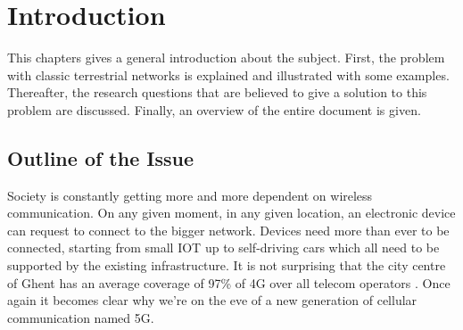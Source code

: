\chapter{Introduction}
\label{chap:intro}

This chapters gives a general introduction about the subject. First, the problem with 
classic terrestrial networks is explained and illustrated with some examples. Thereafter, 
the research questions that are believed to give a solution to this problem are discussed.
Finally, an overview of the entire document is given.

\section{Outline of the Issue} %
\label{sec:issue}

Society is constantly getting more and more dependent on wireless communication. 
On any given moment, in any given location, an electronic device
can request to connect to the bigger network. Devices need more than ever to be connected, 
starting from small \gls{IOT} up to self-driving cars
which all need to be supported by the existing infrastructure. 
It is not surprising that the city centre of Ghent has an average coverage of 97\% of 4G over all telecom operators
\cite{testaankoop}. Once again it becomes clear why we're on the eve of a new generation of cellular communication named 5G. 


